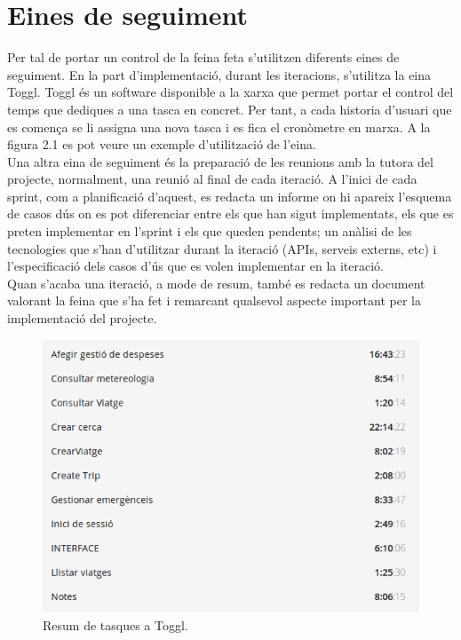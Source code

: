 \section{Eines de seguiment}

Per tal de portar un control de la feina feta s’utilitzen diferents eines de seguiment. En la part d’implementació, durant les iteracions, s’utilitza la eina Toggl. Toggl és un software disponible a la xarxa que permet portar el control del temps que dediques a una tasca en concret. Per tant, a cada historia d’usuari que es comença se li assigna una nova tasca i es fica el cronòmetre en marxa. A la figura 2.1 es pot veure
un exemple d’utilització de l’eina.\\

Una altra eina de seguiment és la preparació de les reunions amb la tutora del projecte, normalment, una reunió al final de cada iteració. A l’inici de cada sprint, com a planificació d’aquest, es redacta un informe on hi apareix l’esquema de casos dús on es pot diferenciar entre els que han sigut implementats, els que es preten implementar en l’sprint i els que queden pendents; un anàlisi de les tecnologies que s’han d’utilitzar durant la iteració (APIs, serveis externs, etc) i l’especificació dels
casos d’ús que es volen implementar en la iteració.\\

Quan s’acaba una iteració, a mode de resum, també es redacta un document
valorant la feina que s’ha fet i remarcant qualsevol aspecte important per la implementació del projecte.

\begin{figure}[!h]
\centering
\includegraphics[scale=0.65]{Figures/toggl.jpg}
\caption{Resum de tasques a Toggl.}
\end{figure}

